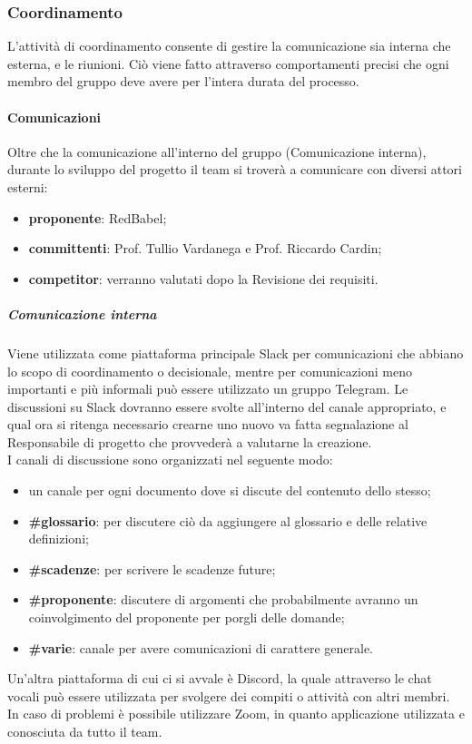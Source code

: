 \subsubsection{Coordinamento}
L'attività di coordinamento consente di gestire la comunicazione sia interna che esterna, e le riunioni. Ciò viene fatto attraverso comportamenti precisi che ogni membro del gruppo deve avere per l'intera durata del processo.

\paragraph{Comunicazioni}
Oltre che la comunicazione all'interno del gruppo (Comunicazione interna), durante lo sviluppo del progetto il team si troverà a comunicare con diversi attori esterni:
\begin{itemize}
    \item \textbf{proponente}: RedBabel;
    \item \textbf{committenti}: Prof. Tullio Vardanega e Prof. Riccardo Cardin;
    \item \textbf{competitor}: verranno valutati dopo la Revisione dei requisiti.
\end{itemize}

\subparagraph{Comunicazione interna}
Viene utilizzata come piattaforma principale Slack per comunicazioni che abbiano lo scopo di coordinamento o decisionale, mentre per comunicazioni meno importanti e più informali può essere utilizzato un gruppo Telegram.
Le discussioni su Slack dovranno essere svolte all'interno del canale appropriato, e qual ora si ritenga necessario crearne uno nuovo va fatta segnalazione al Responsabile di progetto che provvederà a valutarne la creazione.\\
I canali di discussione sono organizzati nel seguente modo:
\begin{itemize}
    \item un canale per ogni documento dove si discute del contenuto dello stesso;
    \item \textbf{\#glossario}: per discutere ciò da aggiungere al glossario e delle relative definizioni;
    \item \textbf{\#scadenze}: per scrivere le scadenze future;
    \item \textbf{\#proponente}: discutere di argomenti che probabilmente avranno un coinvolgimento del proponente per porgli delle domande;
    \item \textbf{\#varie}: canale per avere comunicazioni di carattere generale.
\end{itemize}
Un'altra piattaforma di cui ci si avvale è Discord, la quale attraverso le chat vocali può essere utilizzata per svolgere dei compiti o attività con altri membri. In caso di problemi è possibile utilizzare Zoom, in quanto applicazione utilizzata e conosciuta da tutto il team.

